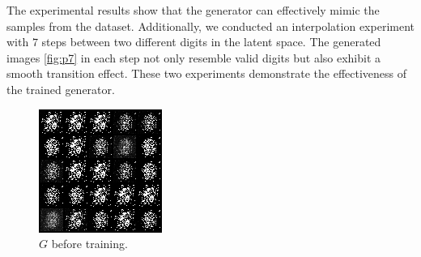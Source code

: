 \documentclass[12pt]{article}
\begin{document}
The experimental results show that the generator can effectively mimic the samples from the dataset. Additionally, we conducted an interpolation experiment with \(7\) steps between two different digits in the latent space. The generated images \cref{fig:p7} in each step not only resemble valid digits but also exhibit a smooth transition effect. These two experiments demonstrate the effectiveness of the trained generator.

\begin{figure}[t]
    \centering
    \begin{minipage}{0.3\textwidth}
        \centering
        \includegraphics[width=\textwidth]{0.png}
        \caption{\(G\) before training.}
        \label{fig:p4}
    \end{minipage}%
    \hfill
    \begin{minipage}{0.3\textwidth}
        \centering

\end{minipage}
\end{figure}
\end{document}
